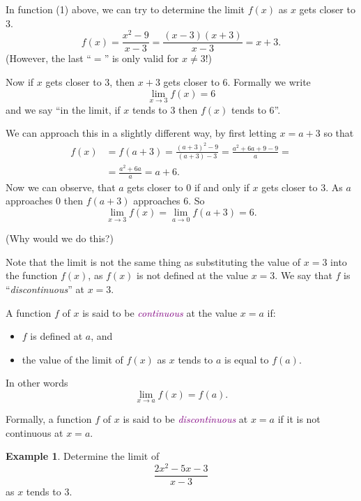 \documentclass[
  english,
  11pt,
  oneside]{book}
\providecommand{\tightlist}{%
  \setlength{\itemsep}{0pt}\setlength{\parskip}{0pt}}
\newcommand{\slide}{}
\theoremstyle{definition}
\theoremstyle{definition}
\newtheorem{example}{Example}[chapter]
\theoremstyle{definition}
\theoremstyle{definition}
\theoremstyle{remark}
\begin{document}
\slide

In function (1) above, we can try to determine the limit \(f(x)\) as \(x\) gets closer to \(3\).
\[f(x) = \frac{x^2-9}{x-3} = \frac{(x-3)(x+3)}{x-3} = x+3.\]
(However, the last ``\(=\)'' is only valid for \(x\not=3\)!)

Now if \(x\) gets closer to \(3\), then \(x+3\) gets closer to \(6\). Formally we write
\[\lim\limits_{x\to3} f(x) = 6\]
and we say ``in the limit, if \(x\) tends to \(3\) then \(f(x)\) tends to 6''.

\slide

We can approach this in a slightly different way, by first letting \(x = a+3\) so that
\begin{align*}
f(x) &= f(a+3) = \frac{(a+3)^2-9}{(a+3)-3} = \frac{a^2+6a + 9 - 9}{a} =\\
&= \frac{a^2+6a}{a} = a+6.
\end{align*}
Now we can observe, that \(a\) gets closer to \(0\) if and only if \(x\) gets closer to \(3\). As \(a\) approaches \(0\) then \(f(a+3)\) approaches \(6\). So
\[\lim\limits_{x\to3}f(x) = \lim\limits_{a\to0}f(a+3) = 6.\]

(Why would we do this?)

\slide

Note that the limit is not the same thing as substituting the value of \(x=3\) into the function \(f(x)\), as \(f(x)\) is not defined at the value \(x=3\). We say that \(f\) is ``\emph{discontinuous}'' at \(x=3\).

A function \(f\) of \(x\) is said to be \textcolor{purple}{\em continuous} at the value \(x=a\) if:

\begin{itemize}
\tightlist
\item
  \(f\) is defined at \(a\), and
\item
  the value of the limit of \(f(x)\) as \(x\) tends to \(a\) is equal to \(f(a)\).
\end{itemize}

In other words
\[\lim\limits_{x\to a}f(x) = f(a).\]

Formally, a function \(f\) of \(x\) is said to be \textcolor{purple}{\em discontinuous} at \(x=a\) if it is not continuous at \(x=a\).
\slide

\begin{example}
Determine the limit of
\[\frac{2x^2-5x-3}{x-3}\]
as \(x\) tends to \(3\).
\end{example}
\end{document}
